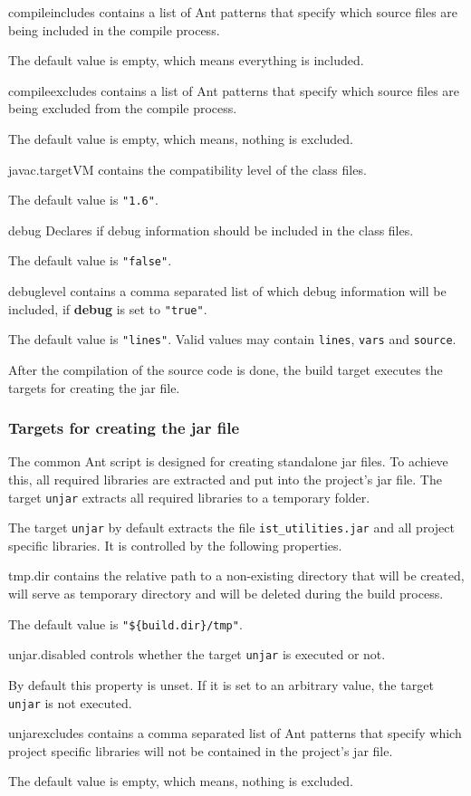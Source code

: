 \documentclass[a4paper,twoside,11pt,bibtotoc]{article}
\begin{document}
\begin{description*}
	\item[compileincludes] contains a list of Ant patterns that specify which source files are being included in the compile process.\par The default value is empty, which means everything is included.
	\item[compileexcludes] contains a list of Ant patterns that specify which source files are being excluded from the compile process.\par The default value is empty, which means, nothing is excluded.
	\item[javac.targetVM] contains the compatibility level of the class files.\par The default value is \texttt{"1.6"}.
	\item[debug] Declares if debug information should be included in the class files.\par The default value is \texttt{"false"}.
	\item[debuglevel] contains a comma separated list of which debug information will be included, if \textbf{debug} is set to \texttt{"true"}.\par The default value is \texttt{"lines"}. Valid values may contain \texttt{lines}, \texttt{vars} and \texttt{source}.
\end{description*}

After the compilation of the source code is done, the build target executes the targets for creating the jar file.

\subsubsection{Targets for creating the jar file}
The common Ant script is designed for creating standalone jar files.
To achieve this, all required libraries are extracted and put into the project's jar file.
The target \texttt{unjar} extracts all required libraries to a temporary folder.

The target \texttt{unjar} by default extracts the file \texttt{ist\_utilities.jar} and all project specific libraries.
It is controlled by the following properties.
\begin{description*}
	\item[tmp.dir] contains the relative path to a non-existing directory that will be created, will serve as temporary directory and will be deleted during the build process.\par The default value is \texttt{"\$\{build.dir\}/tmp"}.
	\item[unjar.disabled] controls whether the target \texttt{unjar} is executed or not.\par By default this property is unset. If it is set to an arbitrary value, the target \texttt{unjar} is not executed.
	\item[unjarexcludes] contains a comma separated list of Ant patterns that specify which project specific libraries will not be contained in the project's jar file.\par The default value is empty, which means, nothing is excluded.
\end{description*}
\end{document}
